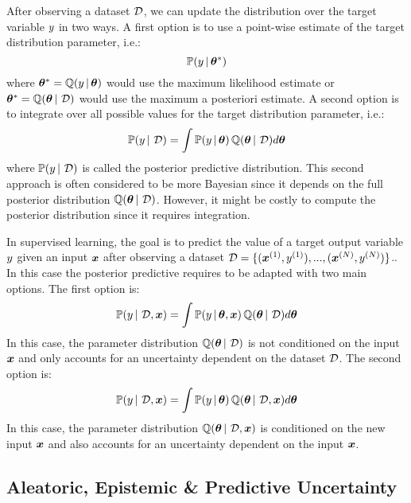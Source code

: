 After observing a dataset $\operatorname{\mathcal{D}}$, we can update the distribution over the target variable $y$ in two ways.
A first option is to use a point-wise estimate of the target distribution parameter, i.e.:
\begin{equation}
    \mathbb{P}(y \,|\, \bm{\theta}^*)
\end{equation}
where $\bm{\theta}^*=\operatorname{\mathbb{Q}}(y \,|\, \bm{\theta})$ would use the maximum likelihood estimate or $\bm{\theta}^*=\operatorname{\mathbb{Q}}(\bm{\theta} \,|\, \operatorname{\mathcal{D}})$ would use the maximum a posteriori estimate.
A second option is to integrate over all possible values for the target distribution parameter, i.e.:
\begin{equation}
    \label{eq:posterior_predictive}
    \mathbb{P}(y \,|\, \operatorname{\mathcal{D}}) = \int \mathbb{P}(y \,|\, \bm{\theta}) \operatorname{\mathbb{Q}}(\bm{\theta} \,|\, \operatorname{\mathcal{D}}) d\bm{\theta}
\end{equation}
where $\mathbb{P}(y \,|\, \operatorname{\mathcal{D}})$ is called the posterior predictive distribution. 
This second approach is often considered to be more Bayesian since it depends on the full posterior distribution $\operatorname{\mathbb{Q}}(\bm{\theta} \,|\, \operatorname{\mathcal{D}})$.
However, it might be costly to compute the posterior distribution since it requires integration.

In supervised learning, the goal is to predict the value of a target output variable $y$ given an input $\bm{x}$ after observing a dataset $\operatorname{\mathcal{D}}=\{(\bm{x}^{(1)}, y^{(1)}), ..., (\bm{x}^{(N)}, y^{(N)})\}$..
In this case the posterior predictive requires to be adapted with two main options. The first option is:
\begin{equation}
    \mathbb{P}(y \,|\, \operatorname{\mathcal{D}}, \bm{x}) = \int \mathbb{P}(y \,|\, \bm{\theta}, \bm{x}) \operatorname{\mathbb{Q}}(\bm{\theta} \,|\, \operatorname{\mathcal{D}}) d\bm{\theta}
\end{equation}
In this case, the parameter distribution $\operatorname{\mathbb{Q}}(\bm{\theta} \,|\, \operatorname{\mathcal{D}})$ is not conditioned on the input $\bm{x}$ and only accounts for an uncertainty dependent on the dataset $\operatorname{\mathcal{D}}$.
The second option is:
\begin{equation}
    \mathbb{P}(y \,|\, \operatorname{\mathcal{D}}, \bm{x}) = \int \mathbb{P}(y \,|\, \bm{\theta}) \operatorname{\mathbb{Q}}(\bm{\theta} \,|\, \operatorname{\mathcal{D}}, \bm{x}) d\bm{\theta}
\end{equation}
In this case, the parameter distribution $\operatorname{\mathbb{Q}}(\bm{\theta} \,|\, \operatorname{\mathcal{D}}, \bm{x})$ is conditioned on the new input $\bm{x}$ and also accounts for an uncertainty dependent on the input $\bm{x}$.

\subsection{Aleatoric, Epistemic \& Predictive Uncertainty}

